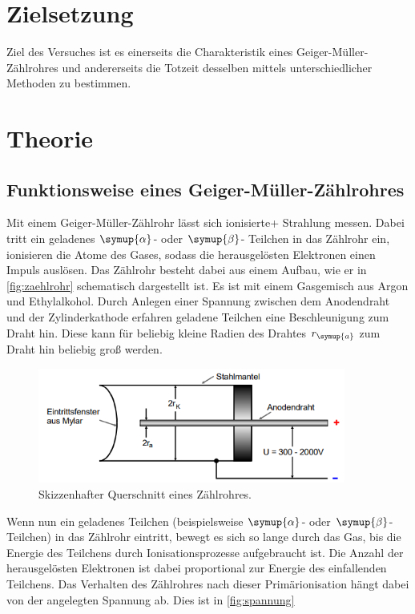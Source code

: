 \section{Zielsetzung}
Ziel des Versuches ist es einerseits die Charakteristik eines Geiger-Müller-Zählrohres und andererseits die Totzeit desselben
mittels unterschiedlicher Methoden zu bestimmen. 
\section{Theorie}
\label{sec:Theorie}
\subsection{Funktionsweise eines Geiger-Müller-Zählrohres}
Mit einem Geiger-Müller-Zählrohr lässt sich ionisierte+ Strahlung messen. Dabei tritt ein geladenes $\symup{\alpha}$- oder $\symup{\beta}$-
Teilchen in das Zählrohr ein, ionisieren die Atome des Gases, sodass die herausgelösten Elektronen einen Impuls auslösen.
Das Zählrohr besteht dabei aus einem Aufbau, wie er in \autoref{fig:zaehlrohr}
schematisch dargestellt ist. Es ist mit einem Gasgemisch aus Argon und Ethylalkohol. Durch Anlegen einer Spannung zwischen dem Anodendraht und
der Zylinderkathode erfahren geladene Teilchen eine Beschleunigung zum Draht hin. Diese kann für beliebig kleine Radien des Drahtes
$r_{\symup{a}}$ zum Draht hin beliebig groß werden.
\begin{figure}
    \centering
    \includegraphics[width=0.9\textwidth]{content/aufbau.png}
    \caption{Skizzenhafter Querschnitt eines Zählrohres.}
    \label{fig:zaehlrohr}
\end{figure}
Wenn nun ein geladenes Teilchen (beispielsweise $\symup{\alpha}$- oder $\symup{\beta}$-Teilchen) in das Zählrohr eintritt, bewegt es sich so 
lange durch das Gas, bis die Energie des Teilchens durch Ionisationsprozesse aufgebraucht ist. Die Anzahl der herausgelösten Elektronen
ist dabei proportional zur Energie des einfallenden Teilchens.
Das Verhalten des Zählrohres nach dieser Primärionisation hängt dabei von der angelegten Spannung ab. Dies ist in \autoref{fig:spannung}
